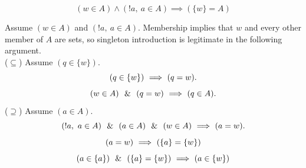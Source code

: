 \begin{theorem}
\[
(w\in A) \land (!a,\ a\in A) \implies (\{w\}=A)
\]
\end{theorem}
\Proof Assume $(w\in A)$ and $(!a,\ a\in A)$. Membership implies
that $w$ and every other member of $A$ are sets, so singleton introduction
is legitimate in the following argument.\\
\noindent($\subseteq$) Assume $(q\in \{w\})$.
\[
(q\in \{w\})\ \Longrightarrow\ (q=w).
\]
\[
(w\in A)\ \ \&\ \ (q=w)\ \Longrightarrow\ (q\in A).
\]
\noindent($\supseteq$) Assume $(a\in A)$.
\[
(!a,\ a\in A)\ \ \&\ \ (a\in A)\ \ \&\ \ (w\in A)\ \Longrightarrow\ (a=w).
\]
\[
(a=w)\ \Longrightarrow\ (\{a\}=\{w\})
\]
\[
(a\in\{a\})\ \ \&\ \ (\{a\}=\{w\})\ \Longrightarrow\ (a\in\{w\})
\]
\Done


